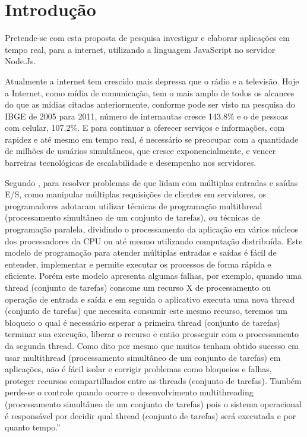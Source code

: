 \chapter{Introdução}
\label{introducao}

\vspace{-1.9cm}

  
  Pretende-se com esta proposta de pesquisa investigar e elaborar aplicações em tempo real, 
  para a internet, utilizando a linguagem JavaScript no servidor Node.Js.
  
  Atualmente a internet tem crescido mais depressa que o rádio e a televisão. 
  Hoje a Internet, como mídia de comunicação, tem o mais amplo de todos os alcances do que as mídias 
  citadas anteriormente, conforme pode ser visto na pesquisa do IBGE de 2005 para 2011, 
  número de internautas cresce 143.8\%  e o de pessoas com celular, 107.2\%. 
  E para continuar a oferecer serviços e informações, com rapidez e até mesmo em tempo real, 
  é necessário se preocupar com a quantidade de milhões de usuários simultâneos, 
  que cresce exponencialmente, e vencer barreiras tecnológicas de escalabilidade e desempenho nos servidores.
  
  Segundo , para resolver problemas de que lidam com múltiplas entradas e saídas \ac{E/S},
  como manipular múltiplas requisições de clientes em servidores, os programadores adotaram utilizar técnicas 
  de programação multithread (processamento simultâneo de um conjunto de tarefas), 
  ou técnicas de programação paralela, dividindo o processamento da aplicação em vários núcleos 
  dos processadores da \ac{CPU} ou até mesmo utilizando computação distribuída. 
  Este modelo de programação para atender múltiplas entradas e saídas é fácil de entender, 
  implementar e permite executar os processos de forma rápida e eficiente. 
  Porém este modelo apresenta algumas falhas, por exemplo, quando uma thread (conjunto de tarefas) 
  consome um recurso X de processamento ou operação de entrada e saída e em seguida o aplicativo executa uma nova 
  thread (conjunto de tarefas) que necessita consumir este mesmo recurso, 
  teremos um bloqueio o qual é necessário esperar a primeira thread (conjunto de tarefas) 
  terminar sua execução, liberar o recurso e então prosseguir com o processamento da segunda thread. 
  Como dito por  mesmo que muitos tenham obtido sucesso em usar 
  multithread (processamento simultâneo de um conjunto de tarefas) em aplicações, 
  não é fácil isolar e corrigir problemas como bloqueios e falhas, 
  proteger recursos compartilhados entre as threads (conjunto de tarefas). 
  Também perde-se o controle quando ocorre o desenvolvimento 
  multithreading (processamento simultâneo de um conjunto de tarefas) pois o sistema operacional é responsável 
  por decidir qual thread (conjunto de tarefas) será executada e por quanto tempo.''~\cite[p. 80]{Tilkov:2010}
  
